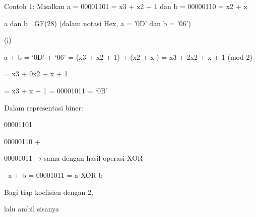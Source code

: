 \documentclass{article}
\begin{document}

Contoh 1:  Misalkan a = 00001101 = x3 + x2 + 1 dan b = 00000110 = x2 + x 


       a dan b  GF(28)      (dalam notasi Hex, a = ’0D’ dan b = ’06’)

(i)

a + b = ‘0D’ + ‘06’ =  (x3 + x2 + 1) +  (x2 + x ) = x3 + 2x2 + x + 1 (mod 2)







   = x3 + 0x2 + x + 1 







   = x3 + x + 1  = 00001011 = ‘0B’


Dalam representasi biner:


00001101


00000110 +


00001011  → sama dengan hasil operasi XOR


 a + b = 00001011 = a XOR b 

Bagi  tiap koefisien dengan 2,

lalu ambil sisanya
\end{document}

